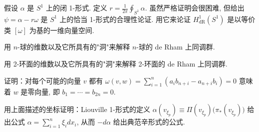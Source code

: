 \begin{question}\label{q:B-13}
假设 $\alpha$ 是 $S^1$ 上的闭 1-形式. 定义 $r=\frac{1}{2\pi}\oint_{S^1}\alpha$. 虽然严格证明会很困难, 但给出 $\psi=\alpha-r\omega$ 是 $S^1$ 上的恰当 1-形式的合理性论证. 用它来论证 $H_{\mathrm{dR}}^1(S^1)$ 是以等价类 $[\omega]$ 为基的一维向量空间.
\end{question}

\begin{question}\label{q:B-14}
用 $n$-球的维数以及它所具有的"洞"来解释 $n$-球的 de Rham 上同调群.
\end{question}

\begin{question}\label{q:B-15}
用 2-环面的维数以及它所具有的"洞"来解释 2-环面的 de Rham 上同调群.
\end{question}

\begin{question}\label{q:B-16}
证明：对每个可能的向量 $v$ 都有 $\omega(v,w)=\sum_{i=1}^{n}(a_ib_{n+i}-a_{n+i}b_i)=0$ 意味着 $w$ 是零向量, 即 $b_1=\cdots=b_{2n}=0$.
\end{question}

\begin{question}\label{q:B-17}
用上面描述的坐标证明：Liouville 1-形式的定义 $\alpha(v_{\xi_p})\equiv\Pi(v_{\xi_p})\bigl(\pi_*(v_{\xi_p})\bigr)$ 给出公式 $\alpha=\sum_{i=1}^{n}\xi_idx_i$, 从而 $-d\alpha$ 给出典范辛形式的公式.
\end{question}
